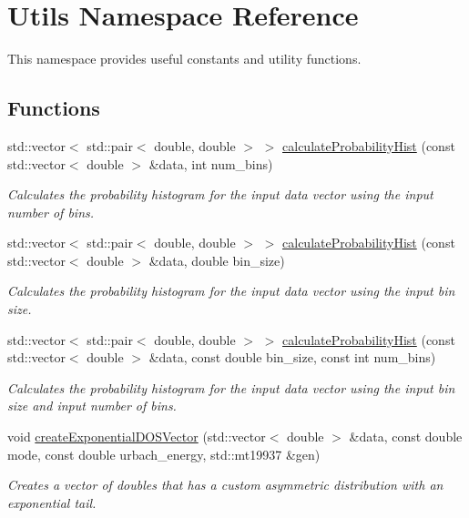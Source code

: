 \hypertarget{namespace_utils}{}\section{Utils Namespace Reference}
\label{namespace_utils}


This namespace provides useful constants and utility functions.  


\subsection*{Functions}
\begin{DoxyCompactItemize}
\item 
std\+::vector$<$ std\+::pair$<$ double, double $>$ $>$ \hyperlink{namespace_utils_adcb2e98774b12bc12264034913547a2c}{calculate\+Probability\+Hist} (const std\+::vector$<$ double $>$ \&data, int num\+\_\+bins)
\begin{DoxyCompactList}\small\item\em Calculates the probability histogram for the input data vector using the input number of bins. \end{DoxyCompactList}\item 
std\+::vector$<$ std\+::pair$<$ double, double $>$ $>$ \hyperlink{namespace_utils_a0818230f8ad279ef7ca217f3cba81f76}{calculate\+Probability\+Hist} (const std\+::vector$<$ double $>$ \&data, double bin\+\_\+size)
\begin{DoxyCompactList}\small\item\em Calculates the probability histogram for the input data vector using the input bin size. \end{DoxyCompactList}\item 
std\+::vector$<$ std\+::pair$<$ double, double $>$ $>$ \hyperlink{namespace_utils_a08553f36886a36456e8111585029e467}{calculate\+Probability\+Hist} (const std\+::vector$<$ double $>$ \&data, const double bin\+\_\+size, const int num\+\_\+bins)
\begin{DoxyCompactList}\small\item\em Calculates the probability histogram for the input data vector using the input bin size and input number of bins. \end{DoxyCompactList}\item 
void \hyperlink{namespace_utils_af296d2aa8f889f67fe515fc641c5f5fe}{create\+Exponential\+D\+O\+S\+Vector} (std\+::vector$<$ double $>$ \&data, const double mode, const double urbach\+\_\+energy, std\+::mt19937 \&gen)
\begin{DoxyCompactList}\small\item\em Creates a vector of doubles that has a custom asymmetric distribution with an exponential tail. \end{DoxyCompactList}\item 

\end{DoxyCompactItemize}
